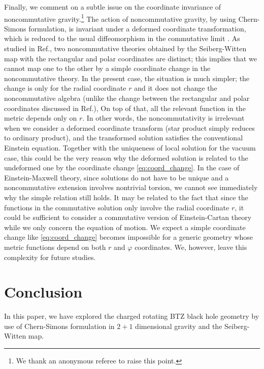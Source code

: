 \documentclass[11pt]{article}
\newcommand{\vap}{\varphi}
\numberwithin{equation}{section}
\begin{document}
Finally, we comment on a subtle issue on the coordinate invariance of noncommutative gravity.\footnote{%
We thank an anonymous referee to raise this point.}
The action of noncommutative gravity, by using Chern-Simons formulation, 
is invariant under a deformed coordinate transformation, which is reduced to the usual diffeomorphism
in the commutative limit \cite{Cacciatori:2002gq}.
As studied in Ref.\cite{ChangYoung:2009sn}, two noncommutative theories obtained by the Seiberg-Witten map
with the rectangular and polar coordinates are distinct; this implies that we cannot map one to the other
by a simple coordinate change in the noncommutative theory.
In the present case, the situation is much simpler; the change is only for the radial coordinate $r$
and it does not change the noncommutative algebra
(unlike the change between the rectangular and polar coordinates discussed in Ref.\cite{ChangYoung:2009sn}),
On top of that, all the relevant function in the metric depends only on $r$.
In other words, the noncommutativity is irrelevant when we consider a deformed coordinate transform (star product
simply reduces to ordinary product), and the transformed solution satisfies the conventional Einstein equation.
Together with the uniqueness of local solution for the vacuum case, 
this could be the very reason why 
 the deformed solution is related
to the undeformed one by the coordinate change \eqref{eq:coord_change}.
In the case of Einstein-Maxwell theory, since solutions do not have to be unique and
a noncommutative extension involves nontrivial torsion, we cannot see immediately
why the simple relation still holds.
It may be related to the fact that since the functions in the commutative solution
only involve the radial coordinate $r$, it could be sufficient to consider a
commutative version of Einstein-Cartan theory while we only concern the
equation of motion.  
We expect a simple coordinate change like \eqref{eq:coord_change}
becomes impossible for a generic geometry whose metric functions
depend on both $r$ and $\vap$ coordinates. 
We, however, leave this complexity for future studies.




\section{Conclusion}
\label{sec:conclusion}

In this paper, we have explored the charged rotating BTZ black hole
geometry by use of Chern-Simons formulation in $2+1$ dimensional 
gravity and the Seiberg-Witten map.
\end{document}

